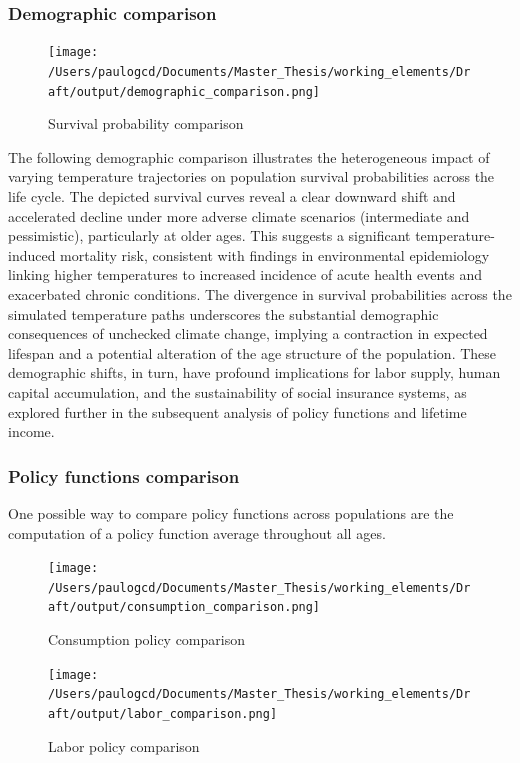 \documentclass{article}
\begin{document}
\subsubsection{Demographic comparison}

\begin{figure}[H]
    \texttt{[image: /Users/paulogcd/Documents/Master\_Thesis/working\_elements/Draft/output/demographic\_comparison.png]}
    \caption{Survival probability comparison}
\end{figure}

The following demographic comparison illustrates the heterogeneous impact of varying temperature trajectories on population survival probabilities across the life cycle.
The depicted survival curves reveal a clear downward shift and accelerated decline under more adverse climate scenarios (intermediate and pessimistic), particularly at older ages.
This suggests a significant temperature-induced mortality risk, consistent with findings in environmental epidemiology linking higher temperatures to increased incidence of acute health events and exacerbated chronic conditions.
The divergence in survival probabilities across the simulated temperature paths underscores the substantial demographic consequences of unchecked climate change, implying a contraction in expected lifespan and a potential alteration of the age structure of the population.
These demographic shifts, in turn, have profound implications for labor supply, human capital accumulation, and the sustainability of social insurance systems, as explored further in the subsequent analysis of policy functions and lifetime income.

\subsubsection{Policy functions comparison}

One possible way to compare policy functions across populations are 
the computation of a policy function average throughout all ages. 

\begin{figure}[H]
    \texttt{[image: /Users/paulogcd/Documents/Master\_Thesis/working\_elements/Draft/output/consumption\_comparison.png]}
    \caption{Consumption policy comparison}
\end{figure}

\begin{figure}[H]
    \texttt{[image: /Users/paulogcd/Documents/Master\_Thesis/working\_elements/Draft/output/labor\_comparison.png]}
    \caption{Labor policy comparison}
\end{figure}
\end{document}
